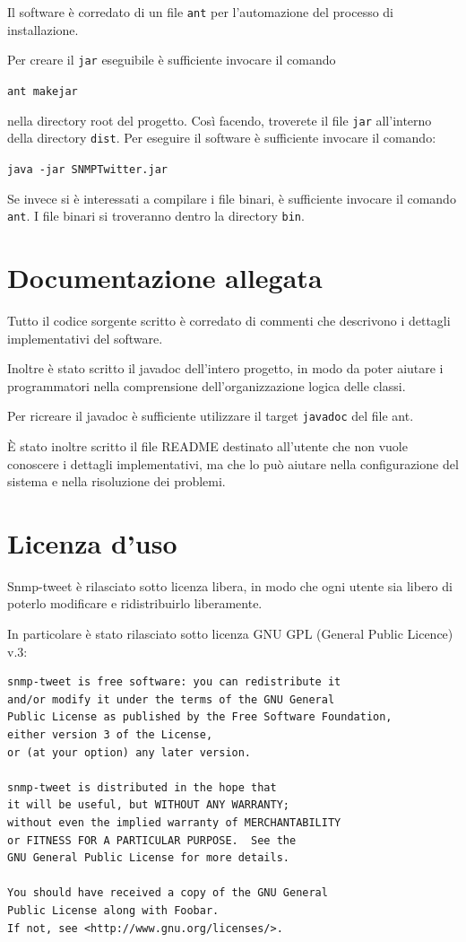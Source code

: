 \documentclass[a4paper, 10pt]{article}
\begin{document}
Il software \`e corredato di un file \texttt{ant} per l'automazione del processo di installazione.

Per creare il \texttt{jar} eseguibile \`e sufficiente invocare il comando 
\begin{center}
\texttt{ant makejar}
\end{center}
nella directory root del progetto. Cos\`i facendo, troverete il file \texttt{jar} all'interno della directory \texttt{dist}. Per eseguire il software \`e sufficiente invocare il comando:

\begin{center}
	\texttt{java -jar SNMPTwitter.jar}
\end{center}

Se invece si \`e interessati a compilare i file binari, \`e sufficiente invocare il comando \texttt{ant}. I file binari si troveranno dentro la directory \texttt{bin}.


\section{Documentazione allegata}

Tutto il codice sorgente scritto \`e corredato di commenti che descrivono i dettagli implementativi del software.

Inoltre \`e stato scritto il javadoc dell'intero progetto, in modo da poter aiutare i programmatori nella comprensione dell'organizzazione logica delle classi.

Per ricreare il javadoc \`e sufficiente utilizzare il target \texttt{javadoc} del file ant.

\`E stato inoltre scritto il file README destinato all'utente che non vuole conoscere i dettagli implementativi, ma che lo pu\`o aiutare nella configurazione del sistema e nella risoluzione dei problemi.

\section{Licenza d'uso}
Snmp-tweet \`e rilasciato sotto licenza libera, in modo che ogni utente sia libero di poterlo modificare e ridistribuirlo liberamente.

In particolare \`e stato rilasciato sotto licenza GNU GPL (General Public Licence) v.3: 
\begin{verbatim}
snmp-tweet is free software: you can redistribute it 
and/or modify it under the terms of the GNU General 
Public License as published by the Free Software Foundation,
either version 3 of the License,
or (at your option) any later version.

snmp-tweet is distributed in the hope that
it will be useful, but WITHOUT ANY WARRANTY;
without even the implied warranty of MERCHANTABILITY
or FITNESS FOR A PARTICULAR PURPOSE.  See the
GNU General Public License for more details.

You should have received a copy of the GNU General 
Public License along with Foobar. 
If not, see <http://www.gnu.org/licenses/>.
\end{verbatim}
\end{document}
